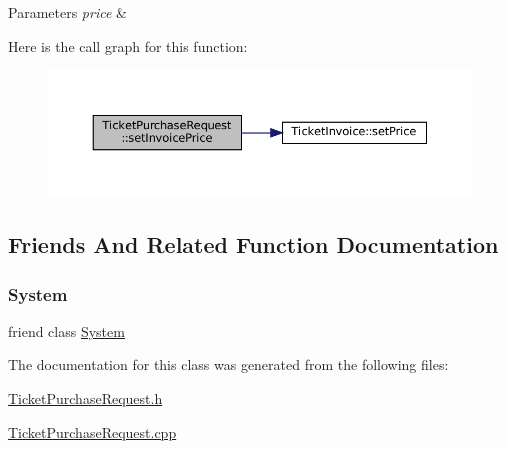 \begin{DoxyParams}{Parameters}
{\em price} & \\
\hline
\end{DoxyParams}
Here is the call graph for this function\+:
\nopagebreak
\begin{figure}[H]
\begin{center}
\leavevmode
\includegraphics[width=350pt]{classTicketPurchaseRequest_a35b5d38bf3d6d00f90041762f2ca93ee_cgraph}
\end{center}
\end{figure}


\subsection{Friends And Related Function Documentation}
\mbox{\label{classTicketPurchaseRequest_af18a9ee98e70982bfe2975391d7221a5}} 
\subsubsection{\texorpdfstring{System}{System}}
{\footnotesize\ttfamily friend class \mbox{\hyperlink{classSystem}{System}}\hspace{0.3cm}{\ttfamily [friend]}}



The documentation for this class was generated from the following files\+:\begin{DoxyCompactItemize}
\item 
\mbox{\hyperlink{TicketPurchaseRequest_8h}{Ticket\+Purchase\+Request.\+h}}\item 
\mbox{\hyperlink{TicketPurchaseRequest_8cpp}{Ticket\+Purchase\+Request.\+cpp}}\end{DoxyCompactItemize}
